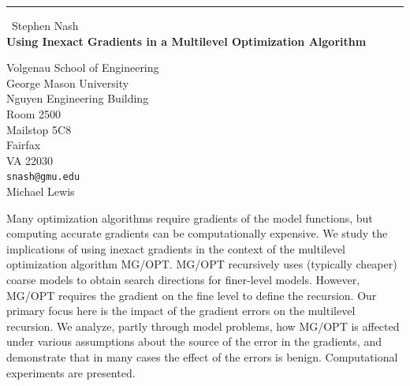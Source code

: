 \documentclass{report}
\begin{document}
\begin{center}
\rule{6in}{1pt} \
{\large Stephen Nash \\
{\bf Using Inexact Gradients in a Multilevel Optimization Algorithm}}

Volgenau School of Engineering \\ George Mason University \\ Nguyen Engineering Building \\ Room 2500 \\ Mailstop 5C8 \\ Fairfax \\ VA 22030
\\
{\tt snash@gmu.edu}\\
Michael Lewis\end{center}

Many optimization algorithms require gradients of the model functions,
but computing accurate gradients can be computationally expensive. We
study the implications of using inexact gradients in the context of the
multilevel optimization algorithm MG/OPT. MG/OPT recursively uses
(typically cheaper) coarse models to obtain search directions for
finer-level models. However, MG/OPT requires the gradient on the fine
level to define the recursion. Our primary focus here is the impact of
the gradient errors on the multilevel recursion. We analyze, partly
through model problems, how MG/OPT is affected under various assumptions
about the source of the error in the gradients, and demonstrate that in
many cases the effect of the errors is benign. Computational experiments
are presented.
\end{document}
